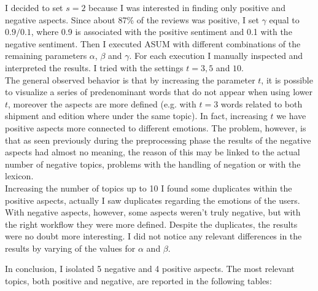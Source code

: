 \documentclass[a4paper,12pt]{article}
\begin{document}
\noindent I decided to set $s=2$ because I was interested in finding only positive and negative aspects. Since about 87\% of the reviews was positive, I set $\gamma$ equal to $0.9/0.1$, where 0.9 is associated with the positive sentiment and 0.1 with the negative sentiment. Then I executed ASUM with different combinations of the remaining parameters $\alpha$, $\beta$ and $\gamma$. For each execution I manually inspected and interpreted the results. I tried with the settings $t=3, 5$ and $10$. \\

\noindent The general observed behavior is that by increasing the parameter $t$, it is possible to visualize a series of predenominant words that do not appear when using lower $t$, moreover the aspects are more defined (e.g.  with $t = 3$ words related to both shipment and edition where under the same topic). In fact, increasing $t$ we have positive aspects more connected to different emotions. The problem, however, is that as seen previously during the preprocessing phase the results of the negative aspects had almost no meaning, the reason of this may be linked to the actual number of negative topics, problems with the handling of negation or with the lexicon. \\

\noindent Increasing the number of topics up to 10 I found some duplicates within the positive aspects, actually I saw duplicates regarding the emotions of the users. With negative aspects, however, some aspects weren't truly negative, but with the right workflow they were more defined. Despite the duplicates, the results were no doubt more interesting. I did not notice any relevant differences in the results by varying of the values for $\alpha$ and $\beta$. 

\noindent In conclusion, I isolated 5 negative and 4 positive aspects. The most relevant topics, both positive and negative, are reported in the following tables:  
\end{document}

